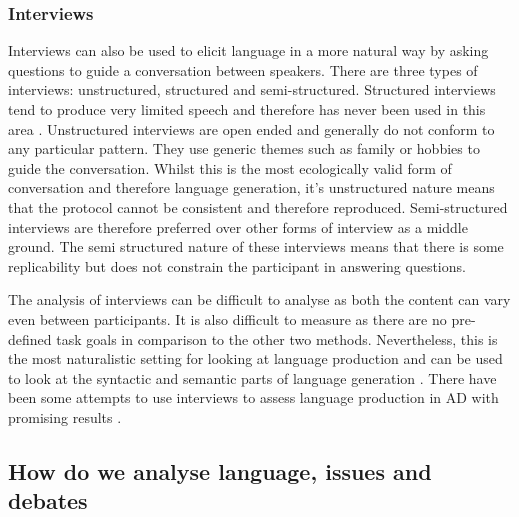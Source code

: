 \documentclass{article}
\begin{document}
\subsubsection{Interviews}
Interviews can also be used to elicit language in a more natural way by asking questions to guide a conversation between speakers. There are three types of interviews: unstructured, structured and semi-structured. Structured interviews tend to produce very limited speech and therefore has never been used in this area \cite{Boschi2017}. Unstructured interviews are open ended and generally do not conform to any particular pattern. They use generic themes such as family or hobbies to guide the conversation. Whilst this is the most ecologically valid form of conversation and therefore language generation, it's unstructured nature means that the protocol cannot be consistent and therefore reproduced. Semi-structured interviews are therefore preferred over other forms of interview as a middle ground. The semi structured nature of these interviews means that there is some replicability but does not constrain the participant in answering questions. \newline
\par
The analysis of interviews can be difficult to analyse as both the content can vary even between participants. It is also difficult to measure as there are no pre-defined task goals in comparison to the other two methods. Nevertheless, this is the most naturalistic setting for looking at language production and can be used to look at the syntactic and semantic parts of language generation \cite{Sajjadi2012}. There have been some attempts to use interviews to assess language production in AD with promising results \cite{Asgari2017, Guinn2015} .\newline
\par
\subsection{How do we analyse language, issues and debates}
\end{document}
